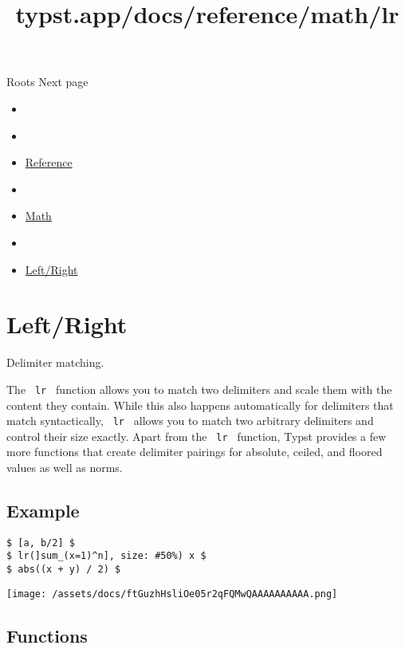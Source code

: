 { Roots } { Next page }


\title{typst.app/docs/reference/math/lr}

\begin{itemize}
\tightlist
\item
  \href{/docs}{}
\item
  
\item
  \href{/docs/reference/}{Reference}
\item
  
\item
  \href{/docs/reference/math/}{Math}
\item
  
\item
  \href{/docs/reference/math/lr}{Left/Right}
\end{itemize}

\section{Left/Right}\label{summary}

Delimiter matching.

The \texttt{\ lr\ } function allows you to match two delimiters and
scale them with the content they contain. While this also happens
automatically for delimiters that match syntactically, \texttt{\ lr\ }
allows you to match two arbitrary delimiters and control their size
exactly. Apart from the \texttt{\ lr\ } function, Typst provides a few
more functions that create delimiter pairings for absolute, ceiled, and
floored values as well as norms.

\subsection{Example}\label{example}

\begin{verbatim}
$ [a, b/2] $
$ lr(]sum_(x=1)^n], size: #50%) x $
$ abs((x + y) / 2) $
\end{verbatim}

\texttt{[image: /assets/docs/ftGuzhHsliOe05r2qFQMwQAAAAAAAAAA.png]}

\subsection{Functions}\label{functions}

